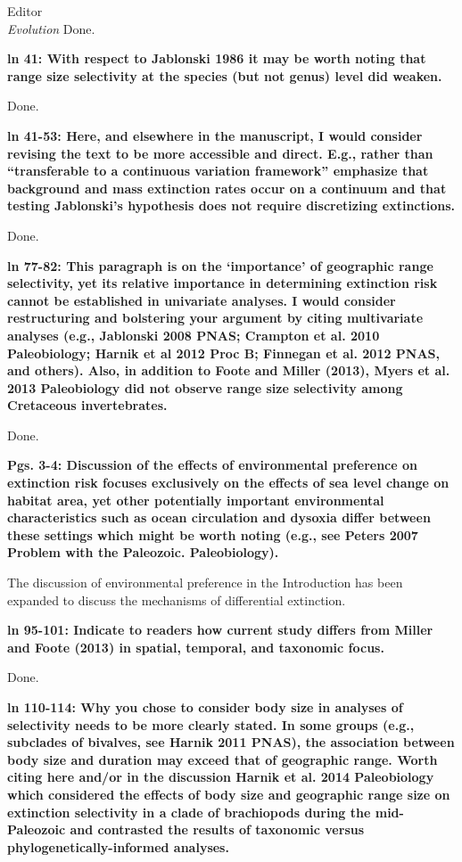 \documentclass{letter}
\begin{document}
\begin{letter}{Editor \\ \textit{Evolution}}
  Done.

  \textbf{ln 41: With respect to Jablonski 1986 it may be worth noting that range size selectivity at the species (but not genus) level did weaken.}

  Done.

  \textbf{ln 41-53: Here, and elsewhere in the manuscript, I would consider revising the text to be more accessible and direct. E.g., rather than “transferable to a continuous variation framework” emphasize that background and mass extinction rates occur on a continuum and that testing Jablonski’s hypothesis does not require discretizing extinctions.}

  Done.

  \textbf{ln 77-82: This paragraph is on the ‘importance’ of geographic range selectivity, yet its relative importance in determining extinction risk cannot be established in univariate analyses. I would consider restructuring and bolstering your argument by citing multivariate analyses (e.g., Jablonski 2008 PNAS; Crampton et al. 2010 Paleobiology; Harnik et al 2012 Proc B; Finnegan et al. 2012 PNAS, and others). Also, in addition to Foote and Miller (2013), Myers et al. 2013 Paleobiology did not observe range size selectivity among Cretaceous invertebrates.}

  Done.

  \textbf{Pgs. 3-4: Discussion of the effects of environmental preference on extinction risk focuses exclusively on the effects of sea level change on habitat area, yet other potentially important environmental characteristics such as ocean circulation and dysoxia differ between these settings which might be worth noting (e.g., see Peters 2007 Problem with the Paleozoic. Paleobiology).}

  The discussion of environmental preference in the Introduction has been expanded to discuss the mechanisms of differential extinction.


  \textbf{ln 95-101: Indicate to readers how current study differs from Miller and Foote (2013) in spatial, temporal, and taxonomic focus.}

  Done.

  \textbf{ln 110-114: Why you chose to consider body size in analyses of selectivity needs to be more clearly stated. In some groups (e.g., subclades of bivalves, see Harnik 2011 PNAS), the association between body size and duration may exceed that of geographic range. Worth citing here and/or in the discussion Harnik et al. 2014 Paleobiology which considered the effects of body size and geographic range size on extinction selectivity in a clade of brachiopods during the mid-Paleozoic and contrasted the results of taxonomic versus phylogenetically-informed analyses.}


\end{letter}
\end{document}

